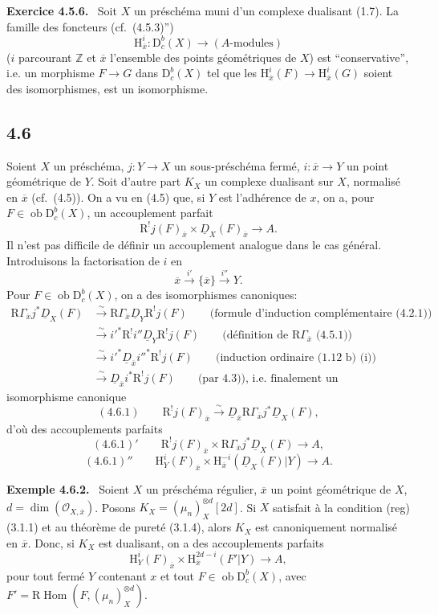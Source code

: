 \documentclass[11pt]{article}
\providecommand{\cO}{\mathcal{O}}
\newenvironment{statement}[1]{\par\medskip\noindent\textbf{#1.}\ }{\par\medskip}
\renewcommand{\H}{\mathrm{H}}
\DeclareMathOperator{\Hom}{Hom}
\newcommand{\R}{\mathrm{R}}
\newcommand{\D}{\mathrm{D}}
\newcommand{\Z}{\mathbb{Z}}
\newcommand{\ob}{\operatorname{ob}}
\newcommand{\ol}[1]{\overline{#1}}
\begin{document}
\begin{statement}{Exercice 4.5.6}
Soit $X$ un préschéma muni d'un complexe dualisant (1.7). La famille des foncteurs (cf.~(4.5.3)'')
\[
\H_{\ol{x}}^i:\D_c^b(X)\longrightarrow (A\text{-modules})
\]
($i$ parcourant $\Z$ et $\ol{x}$ l'ensemble des points géométriques de $X$) est ``conservative'', i.e. un morphisme $F\to G$ dans $\D_c^b(X)$ tel que les $\H_{\ol{x}}^i(F)\to\H_{\ol{x}}^i(G)$ soient des isomorphismes, est un isomorphisme.
\end{statement}

\subsection*{4.6}
Soient $X$ un préschéma, $j:Y\to X$ un sous-préschéma fermé, $i:\ol{x}\to Y$ un point géométrique de $Y$. Soit d'autre part $K_X$ un complexe dualisant sur $X$, normalisé en $\ol{x}$ (cf.~(4.5)). On a vu en (4.5) que, si $Y$ est l'adhérence de $x$, on a, pour $F\in\ob\D_c^b(X)$, un accouplement parfait
\[
\R^{!}j(F)_{\ol{x}}\times \underline{D}_X(F)_{\ol{x}}\longrightarrow A.
\]
Il n'est pas difficile de définir un accouplement analogue dans le cas général. Introduisons la factorisation de $i$ en
\[
\ol{x}\xrightarrow{i'}\{\ol{x}\}\xrightarrow{i''}Y.
\]
Pour $F\in\ob\D_c^b(X)$, on a des isomorphismes canoniques:
\[
\begin{aligned}
\R\Gamma_{\ol{x}}j^*\underline{D}_X(F)&\xrightarrow{\sim}\R\Gamma_{\ol{x}}\underline{D}_Y\R^{!}j(F)\qquad\text{(formule d'induction complémentaire (4.2.1))}\\
&\xrightarrow{\sim}i'^*\R^{!}i''\underline{D}_Y\R^{!}j(F)\qquad\text{(définition de $\R\Gamma_{\ol{x}}$ (4.5.1))}\\
&\xrightarrow{\sim}i'^*\underline{D}_{\ol{x}}i''^*\R^{!}j(F)\qquad\text{(induction ordinaire (1.12 b) (i))}\\
&\xrightarrow{\sim}\underline{D}_{\ol{x}}i^*\R^{!}j(F)\qquad\text{(par 4.3)), i.e. finalement un}
\end{aligned}
\]
isomorphisme canonique
\[
(4.6.1)\qquad \R^{!}j(F)_{\ol{x}}\xrightarrow{\sim}\underline{D}_{\ol{x}}\R\Gamma_{\ol{x}}j^*\underline{D}_X(F),
\]
d'où des accouplements parfaits
\[
(4.6.1)'\qquad \R^{!}j(F)_{\ol{x}}\times \R\Gamma_{\ol{x}}j^*\underline{D}_X(F)\longrightarrow A,
\]
\[
(4.6.1)''\qquad \H_Y^i(F)_{\ol{x}}\times \H_{\ol{x}}^{-i}(\underline{D}_X(F)|Y)\longrightarrow A.
\]

\begin{statement}{Exemple 4.6.2}
Soient $X$ un préschéma régulier, $\ol{x}$ un point géométrique de $X$, $d=\dim(\cO_{X,\ol{x}})$. Posons $K_X=(\mu_n)_X^{\otimes d}[2d]$. Si $X$ satisfait à la condition (reg) (3.1.1) et au théorème de pureté (3.1.4), alors $K_X$ est canoniquement normalisé en $\ol{x}$. Donc, si $K_X$ est dualisant, on a des accouplements parfaits
\[
\H_Y^i(F)_{\ol{x}}\times \H_{\ol{x}}^{2d-i}(F'|Y)\longrightarrow A,
\]
pour tout fermé $Y$ contenant $x$ et tout $F\in\ob\D_c^b(X)$, avec $F'=\R\Hom(F,(\mu_n)_X^{\otimes d})$.
\end{statement}
\end{document}
